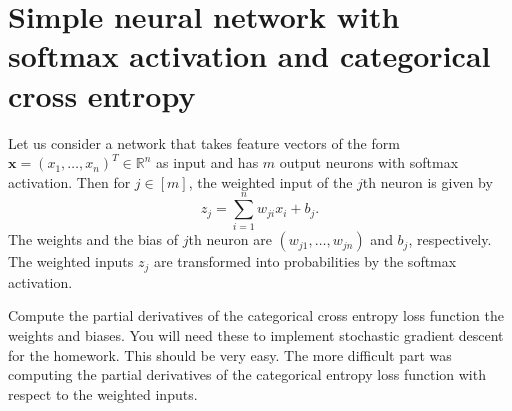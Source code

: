 \documentclass[12pt]{article}
\newcommand{\R}{\mathbb{R}}
\newcommand{\x}{\boldsymbol{x}}
\begin{document}
\section{Simple neural network with softmax activation and categorical cross entropy}

Let us consider a network that takes feature vectors of the form $\x=(x_1,\ldots,x_n)^T\in \R^n$ as input and has $m$ output neurons with softmax activation.  Then for $j\in[m]$, the weighted input of the $j$th neuron is given by
\begin{equation}
z_j = \sum_{i=1}^n w_{ji} x_i + b_j.
\end{equation}
The weights and the bias of $j$th neuron are $(w_{j1},\ldots,w_{jn})$ and $b_j$, respectively.  The weighted inputs $z_j$ are transformed into probabilities by the softmax activation.

\medskip
\noindent
Compute the partial derivatives of the categorical cross entropy loss function the weights and biases. You will need these to implement stochastic gradient descent for the homework. This should be very easy. The more difficult part was computing the partial derivatives of the categorical entropy loss function with respect to the weighted inputs.  
\end{document}
